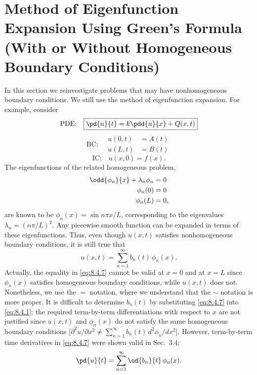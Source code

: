 \section{Method of Eigenfunction Expansion Using Green's Formula (With or Without Homogeneous Boundary Conditions)}
\label{sec:eigenfunction-green}

In this section we reinvestigate problems that may have nonhomogeneous boundary conditions.  We still use the method of eigenfunction expansion.  For example, consider
\begin{equation}
\label{eq:8.4.1}
\text{PDE:}\quad \boxed{\pd{u}{t} = k\pdd{u}{x} + Q(x,t)}
\end{equation}
\begin{equation}
\label{eq:8.4.2}
\text{BC:}\quad \boxed{\begin{aligned} u(0,t) &= A(t) \\ u(L,t) &= B(t) \end{aligned}}
\end{equation}
\begin{equation}
\label{eq:8.4.3}
\text{IC:}\quad \boxed{u(x,0) = f(x).}
\end{equation}
The eigenfunctions of the related homogeneous problem,
\begin{align}
\label{eq:8.4.4}
\odd{\phi_n}{x} + \lambda_n\phi_n &= 0 \\
\label{eq:8.4.5}
\phi_n(0) &= 0 \\
\label{eq:8.4.6}
\phi_n(L) &= 0,
\end{align}
are known to be $\phi_n(x) = \sin n\pi x/L$, corresponding to the eigenvalues $\lambda_n = (n\pi/L)^2$.  Any piecewise smooth function can be expanded in terms of these eigenfunctions.  Thus, even though $u(x,t)$ satisfies nonhomogeneous boundary conditions, it is still true that
\begin{equation}
\label{eq:8.4.7}
\boxed{u(x,t) = \sum_{n=1}^{\infty} b_n(t)\,\phi_n(x).}
\end{equation}
Actually, the equality in \eqref{eq:8.4.7} cannot be valid at $x=0$ and at $x=L$ since $\phi_n(x)$ satisfies homogeneous boundary conditions, while $u(x,t)$ does not.  Nonetheless, we use the $=$ notation, where we understand that the $\sim$ notation is more proper.  It is difficult to determine $b_n(t)$ by substituting \eqref{eq:8.4.7} into \eqref{eq:8.4.1}; the required term-by-term differentiations with respect to $x$ are not justified since $u(x,t)$ and $\phi_n(x)$ do not satisfy the same homogeneous boundary conditions [$\partial^2 u/\partial x^2 \neq \sum_{n=1}^{\infty} b_n(t)\,d^2\phi_n/dx^2$].  However, term-by-term time derivatives in \eqref{eq:8.4.7} were shown valid in Sec.~3.4:
\begin{equation}
\label{eq:8.4.8}
\pd{u}{t} = \sum_{n=1}^{\infty} \od{b_n}{t}\,\phi_n(x).
\end{equation}

